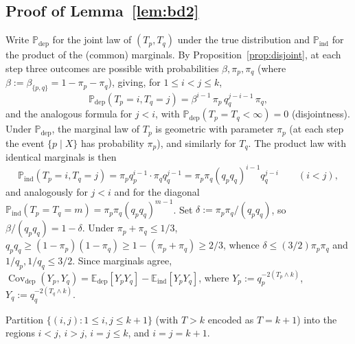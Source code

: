 \documentclass[11pt]{article}
\theoremstyle{remark}
\newcommand{\PP}{\mathbb{P}}
\newcommand{\EE}{\mathbb{E}}
\DeclareMathOperator{\Cov}{Cov}
\begin{document}
\subsection{Proof of Lemma~\ref{lem:bd2}}

Write $\PP_{\mathrm{dep}}$ for the joint law of $(T_p, T_q)$ under the true distribution and $\PP_{\mathrm{ind}}$ for the product of the (common) marginals. By Proposition~\ref{prop:disjoint}, at each step three outcomes are possible with probabilities $\beta, \pi_p, \pi_q$ (where $\beta := \beta_{\{p,q\}} = 1 - \pi_p - \pi_q$), giving, for $1 \leq i < j \leq k$,
\[
\PP_{\mathrm{dep}}(T_p = i, T_q = j) = \beta^{i-1}\, \pi_p\, q_q^{j-i-1}\, \pi_q,
\]
and the analogous formula for $j < i$, with $\PP_{\mathrm{dep}}(T_p = T_q < \infty) = 0$ (disjointness). Under $\PP_{\mathrm{dep}}$, the marginal law of $T_p$ is geometric with parameter $\pi_p$ (at each step the event $\{p \mid X\}$ has probability $\pi_p$), and similarly for $T_q$. The product law with identical marginals is then
\[
\PP_{\mathrm{ind}}(T_p = i, T_q = j) = \pi_p q_p^{i-1} \cdot \pi_q q_q^{j-1} = \pi_p \pi_q (q_p q_q)^{i-1} q_q^{j-i} \qquad (i < j),
\]
and analogously for $j < i$ and for the diagonal $\PP_{\mathrm{ind}}(T_p = T_q = m) = \pi_p \pi_q (q_p q_q)^{m-1}$. Set $\delta := \pi_p \pi_q/(q_p q_q)$, so $\beta/(q_p q_q) = 1 - \delta$. Under $\pi_p + \pi_q \leq 1/3$, $q_p q_q \geq (1 - \pi_p)(1 - \pi_q) \geq 1 - (\pi_p + \pi_q) \geq 2/3$, whence $\delta \leq (3/2) \pi_p \pi_q$ and $1/q_p, 1/q_q \leq 3/2$. Since marginals agree, $\Cov_{\mathrm{dep}}(Y_p, Y_q) = \EE_{\mathrm{dep}}[Y_p Y_q] - \EE_{\mathrm{ind}}[Y_p Y_q]$, where $Y_p := q_p^{-2(T_p \wedge k)}$, $Y_q := q_q^{-2(T_q \wedge k)}$.

Partition $\{(i, j) : 1 \leq i, j \leq k+1\}$ (with $T > k$ encoded as $T = k + 1$) into the regions $i < j$, $i > j$, $i = j \leq k$, and $i = j = k+1$.
\end{document}
